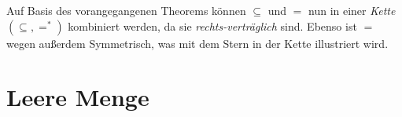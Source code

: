 \documentclass[main.tex]{subfiles}
\begin{document}
\begin{remark}
Auf Basis des vorangegangenen Theorems können \(\subseteq\) und \(=\) nun in einer \emph{Kette} \((\subseteq,=^{*})\) kombiniert werden,  da sie \emph{rechts-verträglich} sind. Ebenso ist \(=\) wegen  außerdem Symmetrisch, was mit dem Stern in der Kette illustriert wird.
\end{remark}

\section{Leere Menge}


\begin{tabproof}
\end{tabproof}

\begin{tabproof}
\end{tabproof}

\begin{tabproof}
\end{tabproof}
\end{document}
